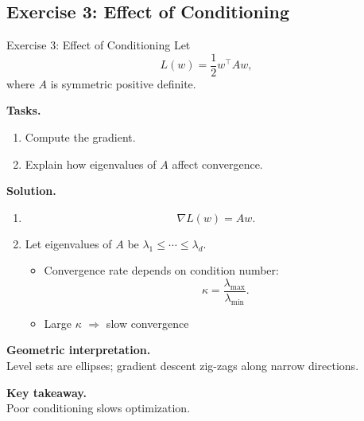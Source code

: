 \documentclass[aspectratio=169,11pt]{beamer}
\begin{document}
\subsection{Exercise 3: Effect of Conditioning}
\begin{frame}[t,allowframebreaks]{Exercise 3: Effect of Conditioning}
\small
Let
\[
L(w) = \frac{1}{2} w^\top A w,
\]
where $A$ is symmetric positive definite.

\textbf{Tasks.}\\ \begin{enumerate}
    \item Compute the gradient.
    \item Explain how eigenvalues of $A$ affect convergence.
\end{enumerate}

\textbf{Solution.}\\ \begin{enumerate}
\item 
\[
\nabla L(w) = A w.
\]

\item Let eigenvalues of $A$ be $\lambda_1 \leq \cdots \leq \lambda_d$.

\begin{itemize}
    \item Convergence rate depends on condition number:
    \[
    \kappa = \frac{\lambda_{\max}}{\lambda_{\min}}.
    \]
    \item Large $\kappa$ $\Rightarrow$ slow convergence
\end{itemize}
\end{enumerate}

\textbf{Geometric interpretation.}\\ Level sets are ellipses; gradient descent zig-zags along narrow directions.

\textbf{Key takeaway.}\\ Poor conditioning slows optimization.
\end{frame}
\end{document}
